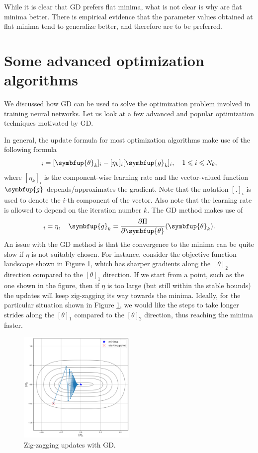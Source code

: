 \documentclass[11pt]{extarticle}
\newcommand{\vg}{\symbfup{g}}
\theoremstyle{definition}
\newcommand{\btheta}{\symbfup{\theta}}
\newcommand{\g}{\symbfup{g}}
\newcommand{\df}[2]{\frac{\partial #1}{\partial #2}}
\begin{document}
While it is clear that GD prefers flat minima, what is not clear is why are flat minima better. There is empirical evidence that the parameter values obtained at flat minima tend to generalize better, and therefore are to be preferred. 

\section*{Some advanced optimization algorithms}
We discussed how GD can be used to solve the optimization problem involved in training neural networks. Let us look at a few advanced and popular optimization techniques motivated by GD. 

In general, the update formula for most optimization algorithms make use of the following formula
\begin{equation}
[\btheta_{k+1}]_i = [\btheta_{k}]_i - [\eta_k ]_i [\vg_k]_i, \quad 1 \leqslant i \leqslant N_\theta,
\end{equation}
where $[\eta_k]_i$ is the component-wise learning rate and the vector-valued function $\g$ depends/approximates the gradient. Note that the notation $[.]_i$ is used to denote the $i$-th component of the vector. Also note that the learning rate is allowed to depend on the iteration number $k$. The GD method makes use of 
\begin{align*}
[\eta_k ]_i = \eta, \quad \g_k = \df{\Pi}{\btheta}(\btheta_k).
\end{align*}
An issue with the GD method is that the convergence to the minima can be quite slow if $\eta$ is not suitably chosen. For instance, consider the objective function landscape shown in Figure \ref{fig:gd_zigzag}, which has sharper gradients along the $[\theta]_2$ direction compared to the $[\theta]_1$ direction. If we start from a point, such as the one shown in the figure, then if $\eta$ is too large (but still within the stable bounds) the updates will keep zig-zagging its way towards the minima. Ideally, for the particular situation shown in Figure \ref{fig:gd_zigzag}, we would like the steps to take longer strides along the $[\theta]_1$ compared to the $[\theta]_2$ direction, thus reaching the minima faster. 

\begin{figure}[htbp!]
\begin{center}
\includegraphics[width=0.5\textwidth]{fig/nn/gd_zigzag.png}
\caption{Zig-zagging updates with GD.}
\label{fig:gd_zigzag}
\end{center}
\end{figure}
\end{document}
